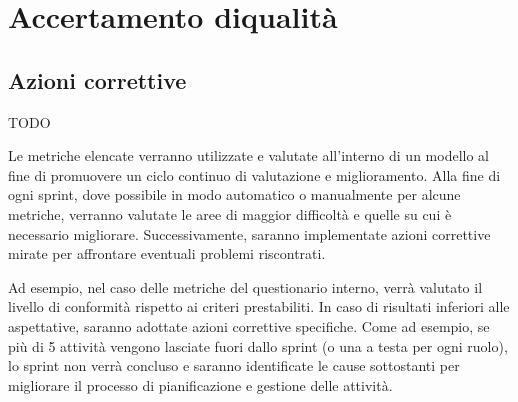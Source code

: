\section{Accertamento diqualità}










\subsection{Azioni correttive}
TODO

Le metriche elencate verranno utilizzate e valutate all'interno di un modello  al fine di promuovere un ciclo continuo di valutazione e miglioramento. Alla fine di ogni sprint, dove possibile in modo automatico o manualmente per alcune metriche, verranno valutate le aree di maggior difficoltà e quelle su cui è necessario migliorare. Successivamente, saranno implementate azioni correttive mirate per affrontare eventuali problemi riscontrati.

Ad esempio, nel caso delle metriche del questionario interno, verrà valutato il livello di conformità rispetto ai criteri prestabiliti. In caso di risultati inferiori alle aspettative, saranno adottate azioni correttive specifiche. Come ad esempio, se più di 5 attività vengono lasciate fuori dallo sprint (o una a testa per ogni ruolo), lo sprint non verrà concluso e saranno identificate le cause sottostanti per migliorare il processo di pianificazione e gestione delle attività.

